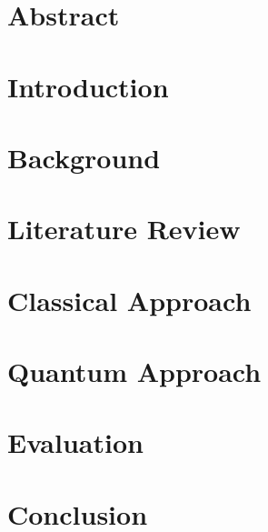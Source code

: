 \documentclass[11pt]{report}
\title{
	{Applications of GAs and QGAs on theoretical fully autonomous road networks} \\
	{\large University of Birmingham} \\ \texorpdfstring
	{\texttt{[image: uobcrest.jpg]}}
}
\author{Sam Barrett \\ sjb786@student.bham.ac.uk}
\begin{document}
\maketitle

\tableofcontents
\newpage

\chapter*{Abstract}

\chapter{Introduction}

\chapter{Background}

\chapter{Literature Review}

\chapter{Classical Approach}

\chapter{Quantum Approach}

\chapter{Evaluation}

\chapter{Conclusion}




\end{document}
